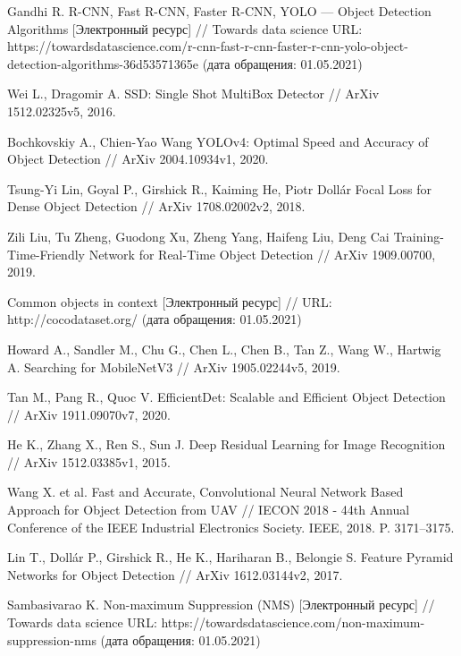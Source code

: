\begin{thebibliography}{00}
    Gandhi R.
    R-CNN, Fast R-CNN, Faster R-CNN, YOLO — Object Detection Algorithms
    [Электронный ресурс] //
    Towards data science
    URL: https://towardsdatascience.com/r-cnn-fast-r-cnn-faster-r-cnn-yolo-object-detection-algorithms-36d53571365e
    (дата обращения: 01.05.2021)

    Wei L., Dragomir A.
    SSD: Single Shot MultiBox Detector //
    ArXiv 1512.02325v5, 2016.

    Bochkovskiy A., Chien-Yao Wang
    YOLOv4: Optimal Speed and Accuracy of Object Detection //
    ArXiv 2004.10934v1, 2020.

    Tsung-Yi Lin, Goyal P., Girshick R., Kaiming He, Piotr Dollár
    Focal Loss for Dense Object Detection //
    ArXiv 1708.02002v2, 2018.

    Zili Liu, Tu Zheng, Guodong Xu, Zheng Yang, Haifeng Liu, Deng Cai
    Training-Time-Friendly Network for Real-Time Object Detection //
    ArXiv 1909.00700, 2019.

    Common objects in context
    [Электронный ресурс] //
    URL: http://cocodataset.org/
    (дата обращения: 01.05.2021)

    Howard A., Sandler M., Chu G., Chen L., Chen B., Tan Z., Wang W., Hartwig A.
    Searching for MobileNetV3 //
    ArXiv 1905.02244v5, 2019.

    Tan M., Pang R., Quoc V.
    EfficientDet: Scalable and Efficient Object Detection //
    ArXiv 1911.09070v7, 2020.

    He K., Zhang X., Ren S., Sun J.
    Deep Residual Learning for Image Recognition //
    ArXiv 1512.03385v1, 2015.

    Wang X. et al.
    Fast and Accurate, Convolutional Neural Network Based Approach for Object Detection from UAV //
    IECON 2018 - 44th Annual Conference of the IEEE Industrial Electronics Society. IEEE, 2018. P. 3171–3175.

    Lin T., Dollár P., Girshick R., He K., Hariharan B., Belongie S.
    Feature Pyramid Networks for Object Detection //
    ArXiv 1612.03144v2, 2017.

    Sambasivarao K.
    Non-maximum Suppression (NMS)
    [Электронный ресурс] //
    Towards data science
    URL: https://towardsdatascience.com/non-maximum-suppression-nms
    (дата обращения: 01.05.2021)


\end{thebibliography}
